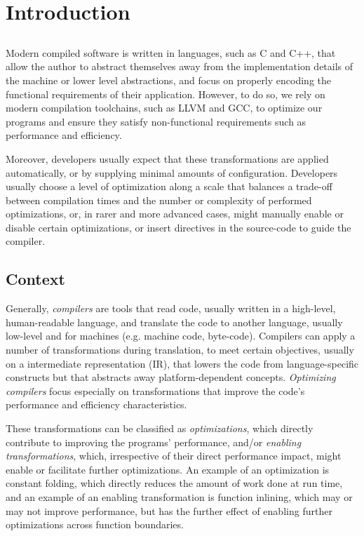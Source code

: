 \chapter{Introduction} \label{chap:intro}

\section*{}

Modern compiled software is written in languages, such as C and C++, that allow the author to abstract themselves away from the implementation details of the machine or lower level abstractions, and focus on properly encoding the functional requirements of their application. However, to do so, we rely on modern compilation toolchains, such as LLVM and GCC, to optimize our programs and ensure they satisfy non-functional requirements such as performance and efficiency.

Moreover, developers usually expect that these transformations are applied automatically, or by supplying minimal amounts of configuration. Developers usually choose a level of optimization along a scale that balances a trade-off between compilation times and the number or complexity of performed optimizations, or, in rarer and more advanced cases, might manually enable or disable certain optimizations, or insert directives in the source-code to guide the compiler.

\section{Context} \label{sec:context}

Generally, \textit{compilers} are tools that read code, usually written in a high-level, human-readable language, and translate the code to another language, usually low-level and for machines (e.g. machine code, byte-code). Compilers can apply a number of transformations during translation, to meet certain objectives, usually on a intermediate representation (IR), that lowers the code from language-specific constructs but that abstracts away platform-dependent concepts.\cite{LattnerAOSA} \textit{Optimizing compilers} focus especially on transformations that improve the code's performance and efficiency characteristics.

These transformations can be classified as \textit{optimizations}, which directly contribute to improving the programs' performance, and/or \textit{enabling transformations}, which, irrespective of their direct performance impact, might enable or facilitate further optimizations. An example of an optimization is constant folding, which directly reduces the amount of work done at run time, and an example of an enabling transformation is function inlining, which may or may not improve performance, but has the further effect of enabling further optimizations across function boundaries.

